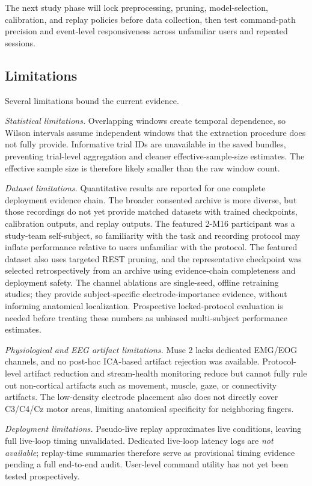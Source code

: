 \documentclass[conference]{IEEEtran}
\newcommand{\NotAvailable}{\textit{not available}}
\begin{document}
The next study phase will lock preprocessing, pruning, model-selection, calibration, and replay policies before data collection, then test command-path precision and event-level responsiveness across unfamiliar users and repeated sessions.

\subsection{Limitations}
\label{sec:limitations}
Several limitations bound the current evidence.

\textit{Statistical limitations.} Overlapping windows create temporal dependence, so Wilson intervals assume independent windows that the extraction procedure does not fully provide. Informative trial IDs are unavailable in the saved bundles, preventing trial-level aggregation and cleaner effective-sample-size estimates. The effective sample size is therefore likely smaller than the raw window count.

\textit{Dataset limitations.} Quantitative results are reported for one complete deployment evidence chain. The broader consented archive is more diverse, but those recordings do not yet provide matched datasets with trained checkpoints, calibration outputs, and replay outputs. The featured 2-M16 participant was a study-team self-subject, so familiarity with the task and recording protocol may inflate performance relative to users unfamiliar with the protocol. The featured dataset also uses targeted REST pruning, and the representative checkpoint was selected retrospectively from an archive using evidence-chain completeness and deployment safety. The channel ablations are single-seed, offline retraining studies; they provide subject-specific electrode-importance evidence, without informing anatomical localization. Prospective locked-protocol evaluation is needed before treating these numbers as unbiased multi-subject performance estimates.

\textit{Physiological and EEG artifact limitations.} Muse 2 lacks dedicated EMG/EOG channels, and no post-hoc ICA-based artifact rejection was available. Protocol-level artifact reduction and stream-health monitoring reduce but cannot fully rule out non-cortical artifacts such as movement, muscle, gaze, or connectivity artifacts. The low-density electrode placement also does not directly cover C3/C4/Cz motor areas, limiting anatomical specificity for neighboring fingers.

\textit{Deployment limitations.} Pseudo-live replay approximates live conditions, leaving full live-loop timing unvalidated. Dedicated live-loop latency logs are \NotAvailable{}; replay-time summaries therefore serve as provisional timing evidence pending a full end-to-end audit. User-level command utility has not yet been tested prospectively.
\end{document}
